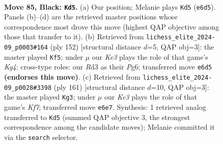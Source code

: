 \documentclass[11pt]{article}
\begin{document}
\clearpage

\begin{figure}[p]\centering
\begin{subfigure}{0.46\textwidth}\centering
\resizebox{\linewidth}{!}{%
\newchessgame
\chessboard[
  setfen={8/8/1R2k3/6K1/r6P/3r4/8/8 b - - 12 85},
  showmover=false,
  pgfstyle=straightmove, color=movearrow, markmove={e6-d5}
]}
\caption{}
\end{subfigure}\hfill
\begin{subfigure}{0.46\textwidth}\centering
\resizebox{\linewidth}{!}{%
\newchessgame
\chessboard[
  setfen={8/8/1r4P1/4R3/6K1/8/4p3/5k2 w - - 1 77},
  showmover=false,
  pgfstyle=straightmove, color=movearrow, markmove={g4-f5}
]}
\caption{}
\end{subfigure}
\\[4pt]
\begin{subfigure}{0.46\textwidth}\centering
\resizebox{\linewidth}{!}{%
\newchessgame
\chessboard[
  setfen={8/8/8/1K6/P7/8/5k2/r7 b - - 3 81},
  showmover=false,
  pgfstyle=straightmove, color=movearrow, markmove={f2-g3}
]}
\caption{}
\end{subfigure}\hfill

\caption{\textbf{Move 85, Black: \texttt{Kd5}.} (a) Our position; Melanie plays \texttt{Kd5} (\texttt{e6d5}). Panels (b)--(d) are the retrieved master positions whose correspondence most drove this move (highest QAP objective among those that transfer to it). (b) Retrieved from \texttt{lichess\_elite\_2024-09\_p0003\#164} (ply 152) [structural distance $d$=5, QAP obj=3]: the master played \texttt{Kf5}; under $\mu$ our \emph{Ke3} plays the role of that game's \emph{Kg4}; cross-type roles: our \emph{R}d3 as their \emph{P}g6; transferred move \texttt{e6d5} \textbf{(endorses this move)}. (c) Retrieved from \texttt{lichess\_elite\_2024-09\_p0028\#3398} (ply 161) [structural distance $d$=10, QAP obj=3]: the master played \texttt{Kg3}; under $\mu$ our \emph{Ke3} plays the role of that game's \emph{Kf7}; transferred move \texttt{e6e7}. Synthesis: 1 retrieved analog transferred to \texttt{Kd5} (summed QAP objective 3, the strongest correspondence among the candidate moves); Melanie committed it via the \texttt{search} selector.}
\label{fig:thought-m169}
\end{figure}

\clearpage
\end{document}
